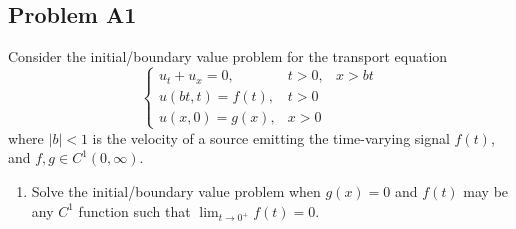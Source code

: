 \documentclass[a4paper,12pt]{article}
\newcommand{\abs}[1]{\left| #1 \right|}
\begin{document}
\subsection*{Problem A1}
    Consider the initial/boundary value problem for the transport equation
    \[
        \left\{\begin{array}{lll}
            u_t + u_x = 0, & t > 0, & x > bt \\
            u(bt, t) = f(t), & t > 0 \\
            u(x,0) = g(x), & x > 0
        \end{array}\right.
    \]
    where $ \abs{b} < 1$ is the velocity of a source emitting the time-varying signal $ f(t) $, and $ f, g \in C^1(0, \infty) $.
    \begin{enumerate}[label = \textbf{(\alph*)}]
        \item Solve the initial/boundary value problem when $ g(x) = 0 $ and $ f(t) $ may be any $ C^1 $ function such that $ \lim_{t \to 0^+} f(t) = 0 $.
        

\end{enumerate}
\end{document}
